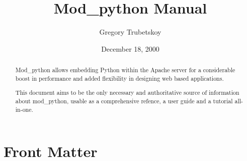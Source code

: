 \documentclass{manual}
\title{Mod\_python Manual}
\author{Gregory Trubetskoy}
\date{December 18, 2000}
\begin{document}
\maketitle

\ifhtml
\chapter*{Front Matter\label{front}}
\fi



\begin{abstract}

\noindent
Mod_python allows embedding Python within the Apache server for a considerable
boost in performance and added flexibility in designing web based
applications.

This document aims to be the only necessary and authoritative source of
information about mod_python, usable as a comprehensive refence, a user guide
and a tutorial all-in-one.

\begin{seealso}
\end{seealso}

\end{abstract}

\tableofcontents

\appendix


\end{document}
